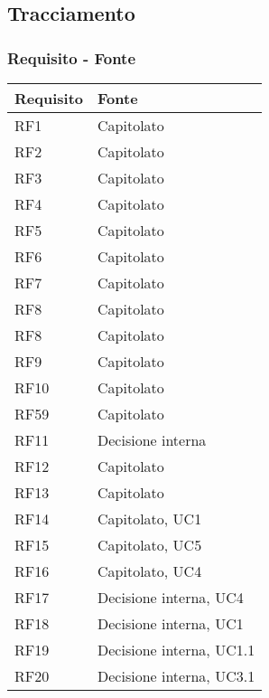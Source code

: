 \subsection{Tracciamento}

\subsubsection{Requisito - Fonte}

\begin{center}
    \begin{longtable}{|C{5cm}|C{5cm}|}
        \hline
        \textbf{Requisito} & \textbf{Fonte} \\
        \hline
        RF1 & Capitolato \\
        \hline
        RF2 & Capitolato \\
        \hline
        RF3 & Capitolato \\
        \hline
        RF4 & Capitolato \\
        \hline
        RF5 & Capitolato \\
        \hline
        RF6 & Capitolato \\
        \hline
        RF7 & Capitolato \\
        \hline
        RF8 & Capitolato \\
        \hline
        RF8 & Capitolato \\
        \hline
        RF9 & Capitolato \\
        \hline
        RF10 & Capitolato \\
        \hline
        RF59 & Capitolato \\
        \hline
        RF11 & Decisione interna \\
        \hline
        RF12 & Capitolato \\
        \hline
        RF13 & Capitolato \\
        \hline
        RF14 & Capitolato, UC1 \\
        \hline
        RF15 & Capitolato, UC5 \\
        \hline
        RF16 & Capitolato, UC4 \\
        \hline
        RF17 & Decisione interna, UC4 \\
        \hline
        RF18 & Decisione interna, UC1 \\
        \hline
        RF19 & Decisione interna, UC1.1 \\
        \hline
        RF20 & Decisione interna, UC3.1 \\

\end{longtable}
\end{center}
